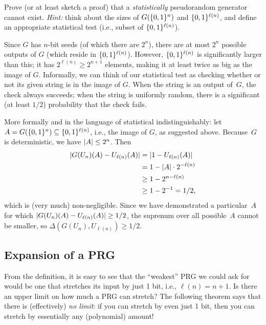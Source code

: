 \documentclass[11pt]{article}
\begin{document}
\begin{question}
  Prove (or at least sketch a proof) that a \emph{statistically}
  pseudorandom generator cannot exist. \emph{Hint:} think about the
  sizes of $G(\{0,1\}^n)$ and $\{0,1\}^{\ell(n)}$, and define an appropriate
  statistical test (i.e., subset of $\{0,1\}^{\ell(n)}$).
\end{question}

\begin{answer}
  Since $G$ has $n$-bit seeds (of which there are $2^n$), there are at
  most $2^n$ possible outputs of $G$ (which reside in
  $\{0,1\}^{\ell(n)}$). However, $\{0,1\}^{\ell(n)}$ is significantly larger
  than this; it has $2^{\ell(n)} \geq 2^{n+1}$ elements, making it at
  least twice as big as the image of \(G\). Informally, we can think
  of our statistical test as checking whether or not its given string
  is in the image of $G$. When the string is an output of~$G$, the
  check always succeeds; when the string is uniformly random, there is
  a significant (at least $1/2$) probability that the check fails.

  More formally and in the language of statistical indistinguishably:
  let $A = G(\{0,1\}^n) \subseteq \{0,1\}^{\ell(n)}$, i.e., the image of
  $G$, as suggested above. Because~$G$ is deterministic, we have
  $\lvert A\rvert \leq 2^{n}$. Then
  \begin{align*}
    \lvert G(U_n)(A) - U_{\ell(n)}(A)\rvert &= \lvert1 - U_{\ell(n)}(A)\rvert \\
                                     &= 1 - \lvert A\rvert \cdot 2^{-\ell(n)}  \\
                                     &\geq 1 - 2^{n-\ell(n)} \\
                                     &\geq 1 - 2^{-1} = 1/2,
  \end{align*}
  which is (very much) non-negligible. Since we have demonstrated a
  particular~$A$ for which
  $\lvert G(U_n)(A) - U_{\ell(n)}(A)\rvert \geq 1/2$, the suprenum over all
  possible~$A$ cannot be smaller, so
  $\Delta(G(U_n), U_{\ell(n)}) \geq 1/2$.
\end{answer}

\subsection{Expansion of a PRG}
\label{sec:properties}

From the definition, it is easy to see that the ``weakest'' PRG we
could ask for would be one that stretches its input by just 1 bit,
i.e., $\ell(n) = n+1$.  Is there an upper limit on how much a PRG can
stretch?  The following theorem says that there is (effectively)
\emph{no limit}: if you can stretch by even just 1 bit, then you can
stretch by essentially any (polynomial) amount!
\end{document}
